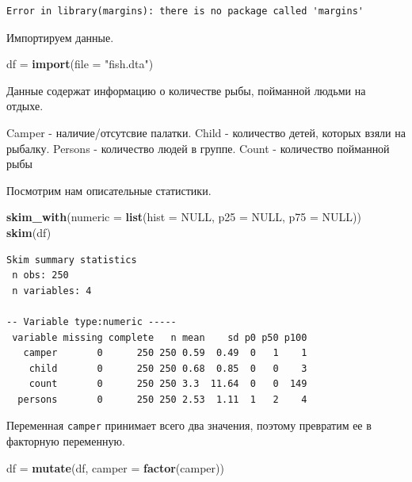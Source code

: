 \documentclass[]{book}
\newenvironment{Shaded}{\begin{snugshade}}{\end{snugshade}}
\newcommand{\DataTypeTok}[1]{\textcolor[rgb]{0.13,0.29,0.53}{#1}}
\newcommand{\KeywordTok}[1]{\textcolor[rgb]{0.13,0.29,0.53}{\textbf{#1}}}
\newcommand{\NormalTok}[1]{#1}
\newcommand{\OtherTok}[1]{\textcolor[rgb]{0.56,0.35,0.01}{#1}}
\newcommand{\StringTok}[1]{\textcolor[rgb]{0.31,0.60,0.02}{#1}}
\begin{document}
\begin{verbatim}
Error in library(margins): there is no package called 'margins'
\end{verbatim}

Импортируем данные.

\begin{Shaded}
\begin{Highlighting}[]
\NormalTok{df =}\StringTok{ }\KeywordTok{import}\NormalTok{(}\DataTypeTok{file =} \StringTok{"fish.dta"}\NormalTok{)}
\end{Highlighting}
\end{Shaded}

Данные содержат информацию о количестве рыбы, пойманной людьми на отдыхе.

Camper - наличие/отсутсвие палатки.
Child - количество детей, которых взяли на рыбалку.
Persons - количество людей в группе.
Count - количество пойманной рыбы

Посмотрим нам описательные статистики.

\begin{Shaded}
\begin{Highlighting}[]
\KeywordTok{skim_with}\NormalTok{(}\DataTypeTok{numeric =} \KeywordTok{list}\NormalTok{(}\DataTypeTok{hist =} \OtherTok{NULL}\NormalTok{, }\DataTypeTok{p25 =} \OtherTok{NULL}\NormalTok{, }\DataTypeTok{p75 =} \OtherTok{NULL}\NormalTok{))}
\KeywordTok{skim}\NormalTok{(df)}
\end{Highlighting}
\end{Shaded}

\begin{verbatim}
Skim summary statistics
 n obs: 250 
 n variables: 4 

-- Variable type:numeric -----
 variable missing complete   n mean    sd p0 p50 p100
   camper       0      250 250 0.59  0.49  0   1    1
    child       0      250 250 0.68  0.85  0   0    3
    count       0      250 250 3.3  11.64  0   0  149
  persons       0      250 250 2.53  1.11  1   2    4
\end{verbatim}

Переменная \texttt{camper} принимает всего два значения, поэтому превратим ее в факторную переменную.

\begin{Shaded}
\begin{Highlighting}[]
\NormalTok{df =}\StringTok{ }\KeywordTok{mutate}\NormalTok{(df, }\DataTypeTok{camper =} \KeywordTok{factor}\NormalTok{(camper))}
\end{Highlighting}
\end{Shaded}
\end{document}
